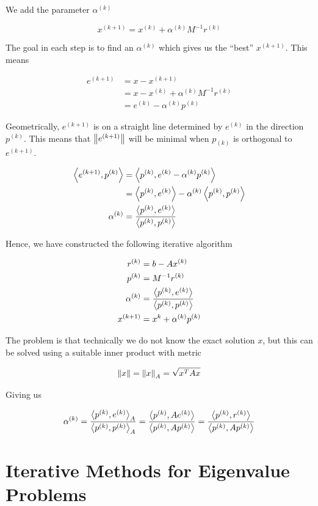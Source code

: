 We add the parameter \(\alpha^{(k)}\)

\[
    x^{(k + 1)} = x^{(k)} + \alpha^{(k)}M^{-1}r^{(k)}
\]

The goal in each step is to find an \(\alpha^{(k)}\) which gives us the ``best'' \(x^{(k + 1)}\).
This means 

\begin{align*} 
    e^{(k + 1)} &= x - x^{(k + 1)} \\ 
    &= x - x^{(k)} + \alpha^{(k)}M^{-1}r^{(k)} \\ 
    &= e^{(k)} - \alpha^{(k)}p^{(k)}
\end{align*}

Geometrically, \(e^{(k + 1)}\) is on a straight line determined by \(e^{(k)}\) in the direction \(p^{(k)}\). This means 
that \(\left\| e^{(k + 1)} \right\|\) will be minimal when \(p_{(k)}\) is orthogonal to \(e^{(k + 1)}\).

\begin{align*}
    \left\langle e^{(k + 1)}, p^{(k)}\right\rangle &= \left\langle p^{(k)}, e^{(k)} - \alpha^{(k)}p^{(k)}\right\rangle \\ 
    &= \left\langle p^{(k)}, e^{(k)}\right\rangle - \alpha^{(k)} \left\langle p^{(k)}, p^{(k)}\right\rangle \\ 
    \alpha^{(k)} &= \frac{\left\langle p^{(k)}, e^{(k)}\right\rangle}{\left\langle p^{(k)}, p^{(k)}\right\rangle}
\end{align*}

Hence, we have constructed the following iterative algorithm 

\begin{align*}
   r^{(k)} &= b - Ax^{(k)}  \\
   p^{(k)} &= M^{-1}r^{(k)} \\ 
   \alpha^{(k)} &= \frac{\left\langle p^{(k)}, e^{(k)}\right\rangle}{\left\langle p^{(k)}, p^{(k)}\right\rangle} \\ 
   x^{(k + 1)} &= x^{k} + \alpha^{(k)}p^{(k)}
\end{align*}

The problem is that technically we do not know the exact solution \(x\), but this can be solved using a 
suitable inner product with metric 

\[
    \left\| x \right\| = \left\| x \right\|_A = \sqrt{x^T A x}
\]

Giving us 

\[
   \alpha^{(k)} =  \frac{\left\langle p^{(k)}, e^{(k)}\right\rangle_A}{\left\langle p^{(k)}, p^{(k)}\right\rangle_A}
   = \frac{\left\langle p^{(k)}, Ae^{(k)}\right\rangle}{\left\langle p^{(k)}, Ap^{(k)}\right\rangle}
   = \frac{\left\langle p^{(k)}, r^{(k)}\right\rangle}{\left\langle p^{(k)}, Ap^{(k)}\right\rangle}
\]

\section{Iterative Methods for Eigenvalue Problems}

